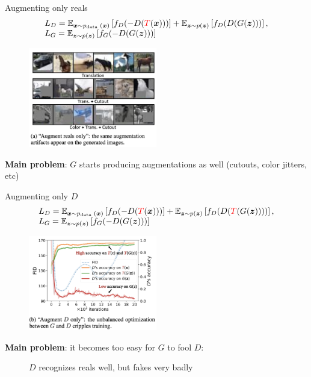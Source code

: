 \documentclass[handout, 10pt]{beamer}
\begin{document}
\begin{frame}{Augmenting only reals}
\begin{equation}
\begin{array}{l}
L_{D}=\mathbb{E}_{\boldsymbol{x} \sim p_{\text {data }}(\boldsymbol{x})}\left[f_{D}(-D(\textcolor{red}{T}(\boldsymbol{x})))\right]+\mathbb{E}_{\boldsymbol{z} \sim p(\boldsymbol{z})}\left[f_{D}(D(G(\boldsymbol{z})))\right], \\
L_{G}=\mathbb{E}_{\boldsymbol{z} \sim p(\boldsymbol{z})}\left[f_{G}(-D(G(\boldsymbol{z})))\right]
\end{array}
\end{equation}

\begin{figure}
\centering
\includegraphics[width=0.5\textwidth]{images/aug-reals-only}
\end{figure}
\textbf{Main problem}: $G$ starts producing augmentations as well (cutouts, color jitters, etc)
\end{frame}


\begin{frame}{Augmenting only $D$}
\begin{equation}
\begin{array}{l}
L_{D}=\mathbb{E}_{\boldsymbol{x} \sim p_{\text {data }}(\boldsymbol{x})}\left[f_{D}(-D(\textcolor{red}{T}(\boldsymbol{x})))\right]+\mathbb{E}_{\boldsymbol{z} \sim p(\boldsymbol{z})}\left[f_{D}(D(\textcolor{red}{T}(G(\boldsymbol{z}))))\right], \\
L_{G}=\mathbb{E}_{\boldsymbol{z} \sim p(\boldsymbol{z})}\left[f_{G}(-D(G(\boldsymbol{z})))\right]
\end{array}
\end{equation}

\begin{figure}
\centering
\includegraphics[width=0.5\textwidth]{images/aug-d-only.png}
\end{figure}
\textbf{Main problem}: it becomes too easy for $G$ to fool $D$:
\begin{figure}
    \item\pause $D$ recognizes reals well, but fakes very badly
\end{figure}
\end{frame}
\end{document}
